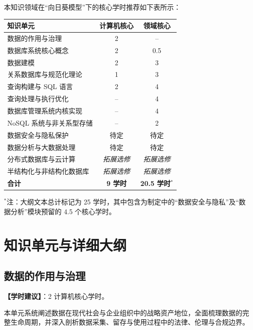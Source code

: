 本知识领域在“向日葵模型”下的核心学时推荐如下表所示：

\begin{table}[H]
\centering
\setlength{\tabcolsep}{3.5pt}\fontsize{8pt}{9.6pt}\selectfont\begin{tabularx}{\columnwidth}{Y c c}
\toprule
\textbf{知识单元} & \textbf{计算机核心} & \textbf{领域核心} \\
\midrule
数据的作用与治理 & 2 & -- \\
数据库系统核心概念 & 2 & 0.5 \\
数据建模 & 2 & 3 \\
关系数据库与规范化理论 & 1 & 3 \\
查询构建与 SQL 语言 & 2 & 4 \\
查询处理与执行优化 & -- & 4 \\
数据库管理系统内核实现 & -- & 4 \\
NoSQL 系统与非关系型存储 & -- & 2 \\
数据安全与隐私保护 & 待定 & 待定 \\
数据分析与大数据处理 & 待定 & 待定 \\
分布式数据库与云计算 & \emph{拓展选修} & \emph{拓展选修} \\
半结构化与非结构化数据库 & \emph{拓展选修} & \emph{拓展选修} \\
\midrule
\textbf{合计} & \textbf{9 学时} & \textbf{20.5 学时$^*$} \\
\bottomrule
\end{tabularx}
\begin{flushleft}\footnotesize
\vspace{-2pt}
$^*$注：大纲文本总计标记为 25 学时，其中包含为制定中的“数据安全与隐私”及“数据分析”模块预留的 4.5 个核心学时。
\end{flushleft}
\end{table}

\section{知识单元与详细大纲}

\subsection{数据的作用与治理}
\textbf{【学时建议】}：2 计算机核心学时。

本单元系统阐述数据在现代社会与企业组织中的战略资产地位，全面梳理数据的完整生命周期，并深入剖析数据采集、留存与使用过程中的法律、伦理与合规边界。

